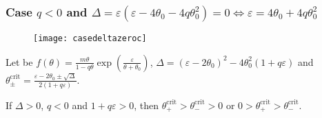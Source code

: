 \documentclass[
    8pt,
    aspectratio=1610,
    c,
    intlimits,
    leqno,
    professionalfonts,
]{beamer}
\begin{document}
\begin{frame}
	\frametitle{Case $q<0$ and
		\begin{math}
			\Delta=
			\varepsilon\left(\varepsilon-4\theta_{0}-4q\theta^{2}_{0}\right)=
			0\iff\varepsilon=4\theta_{0}+4q\theta^{2}_{0}
		\end{math}
	}

	\begin{figure}[ht!]
		\centering
		\texttt{[image: casedeltazeroc]}
	\end{figure}
\end{frame}

\begin{frame}
	Let be
	\begin{math}
		f\left(\theta\right)=
		\frac{m\theta}{1-q\theta}
		\exp
		\left(
		\frac{\varepsilon}{\theta+\theta_{0}}
		\right)
	\end{math},
	\begin{math}
		\Delta=
		{\left(\varepsilon-2\theta_{0}\right)}^{2}-
		4\theta^{2}_{0}
		\left(1+q\varepsilon\right)
	\end{math}
	and
	\begin{math}
		\theta^{\text{crit}}_{\pm}=
		\frac{\varepsilon-2\theta_{0}\pm\sqrt{\Delta}}{2\left(1+q\varepsilon\right)}
	\end{math}.
	\begin{theorem}
		If
		\begin{math}
			\Delta>
			0
		\end{math},
		$q<0$ and $1+q\varepsilon>0$, then
		\begin{math}
			\theta^{\text{crit}}_{+}>
			\theta^{\text{crit}}_{-}>0
		\end{math}
		or
		\begin{math}
			0>
			\theta^{\text{crit}}_{+}>
			\theta^{\text{crit}}_{-}
		\end{math}.
	\end{theorem}


\end{frame}
\end{document}
